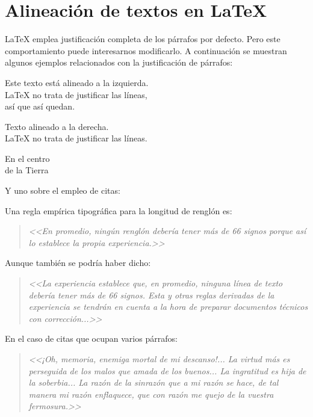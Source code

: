 \section{Alineación de textos en \LaTeX{}}
\label{sec:alinea} %

\LaTeX{} emplea justificación completa de los párrafos por defecto. Pero este comportamiento puede interesarnos modificarlo. A continuación se muestran algunos ejemplos relacionados con la justificación de párrafos:

\begin{flushleft}
	Este texto está alineado a la izquierda. \\
	\LaTeX{} no trata de justificar las líneas, \\ 
	así que así quedan.
\end{flushleft}

\begin{flushright}
	Texto alineado a la derecha. \\
	\LaTeX{} no trata de justificar las líneas.
\end{flushright}

\begin{center}
	En el centro\\
	de la Tierra
\end{center}


\noindent Y uno sobre el empleo de citas:

Una regla empírica tipográfica para la longitud de renglón es:

\begin{quote}
\emph{<<En promedio, ningún renglón debería tener más de 66 signos porque así lo establece la propia experiencia.>>}
\end{quote}


Aunque también se podría haber dicho:


\begin{quote}
\emph{<<La experiencia establece que, en promedio, ninguna línea de texto debería tener más de 66 signos. Esta y otras reglas derivadas de la experiencia se tendrán en cuenta a la hora de preparar documentos técnicos con corrección...>>}
\end{quote}

En el caso de citas que ocupan varios párrafos:


\begin{quotation}
{\em <<¡Oh, memoria, enemiga mortal de mi descanso!...
La virtud más es perseguida de los malos que amada de los buenos...
La ingratitud es hija de la soberbia...
La razón de la sinrazón que a mi razón se hace, de tal manera mi razón enflaquece, que con razón me quejo de la vuestra fermosura.>>}
\end{quotation}

